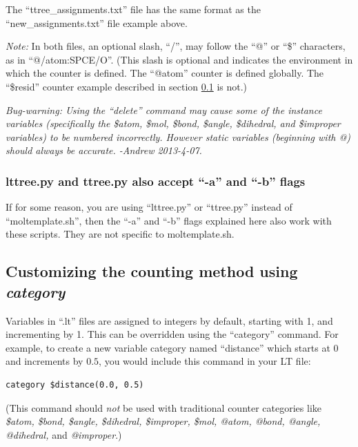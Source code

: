 \documentclass[11pt]{article}
\begin{document}
The ``ttree\_assignments.txt'' file has the same format 
as the ``new\_assignments.txt'' file example above.

\textit{Note:} In both files, an optional slash, ``/'', 
      may follow the ``@'' or ``\$'' characters, 
      as in ``@/atom:SPCE/O''. 
(This slash is optional and indicates
the environment in which the counter is defined.
The ``@atom'' counter is defined globally.
The ``\$resid'' counter example described 
in section \ref{sec:custom_categories} is not.)

\textit{Bug-warning: Using the ``delete'' command 
may cause some of the instance variables
(specifically the \$atom, \$mol, \$bond, \$angle, \$dihedral, 
and \$improper variables)
to be numbered incorrectly.  
However static variables (beginning with @) should always be accurate.
-Andrew 2013-4-07.}


\subsubsection*{lttree.py and ttree.py also accept ``-a'' and ``-b'' flags}
If for some reason, you are using ``lttree.py'' or ``ttree.py'' 
instead of ``moltemplate.sh'', then the ``-a'' and ``-b'' flags explained 
here also work with these scripts.  They are not specific to moltemplate.sh.




\subsection{Customizing the counting method using \textit{category}}
\label{sec:custom_categories}
Variables in ``.lt'' files are assigned to integers by default,
starting with 1, and incrementing by 1.
This can be overridden using the ``category'' command.
For example, to create a new variable category named ``distance''
which starts at $0$ and increments by $0.5$, 
you would include this command in your LT file:
\begin{verbatim}
category $distance(0.0, 0.5)
\end{verbatim}
(This command should \textit{not} be used with traditional counter categories
 like 
\textit{\$atom, \$bond, \$angle, \$dihedral, \$improper, \$mol, 
@atom, @bond, @angle, @dihedral,} and \textit{@improper}.)
\end{document}
